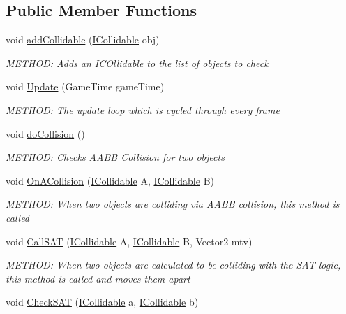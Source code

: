 \subsection*{Public Member Functions}
\begin{DoxyCompactItemize}
\item 
void \hyperlink{a00430_a11808ec009ee682fa73e3c4ea6570139}{add\+Collidable} (\hyperlink{a00426}{I\+Collidable} obj)
\begin{DoxyCompactList}\small\item\em M\+E\+T\+H\+OD\+: Adds an I\+C\+Ollidable to the list of objects to check \end{DoxyCompactList}\item 
void \hyperlink{a00430_aeaa36b46e3ecd301b2fce9197fb0a35c}{Update} (Game\+Time game\+Time)
\begin{DoxyCompactList}\small\item\em M\+E\+T\+H\+OD\+: The update loop which is cycled through every frame \end{DoxyCompactList}\item 
void \hyperlink{a00430_a139cca7ebb8b37ceba1bb1439cde83bf}{do\+Collision} ()
\begin{DoxyCompactList}\small\item\em M\+E\+T\+H\+OD\+: Checks A\+A\+BB \hyperlink{a00255}{Collision} for two objects \end{DoxyCompactList}\item 
void \hyperlink{a00430_ac0f8278b5b5a1c103da46f154ad088dc}{On\+A\+Collision} (\hyperlink{a00426}{I\+Collidable} A, \hyperlink{a00426}{I\+Collidable} B)
\begin{DoxyCompactList}\small\item\em M\+E\+T\+H\+OD\+: When two objects are colliding via A\+A\+BB collision, this method is called \end{DoxyCompactList}\item 
void \hyperlink{a00430_ad87743faa9c3c212879716d7306c4fb3}{Call\+S\+AT} (\hyperlink{a00426}{I\+Collidable} A, \hyperlink{a00426}{I\+Collidable} B, Vector2 mtv)
\begin{DoxyCompactList}\small\item\em M\+E\+T\+H\+OD\+: When two objects are calculated to be colliding with the S\+AT logic, this method is called and moves them apart \end{DoxyCompactList}\item 
void \hyperlink{a00430_a1acd238daa104a8f4dcf36536e1ac9f9}{Check\+S\+AT} (\hyperlink{a00426}{I\+Collidable} a, \hyperlink{a00426}{I\+Collidable} b)

\end{DoxyCompactItemize}
